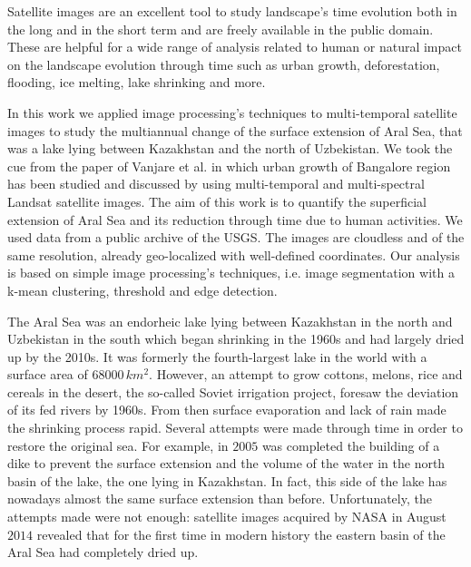 Satellite images are an excellent tool to study landscape's time evolution both in the long and in the short term and are freely available in the public domain. 
These are helpful for a wide range of analysis related to human or natural impact on the landscape evolution through time such as urban growth, deforestation, flooding, ice melting, lake shrinking and more.

In this work we applied image processing's techniques to multi-temporal satellite images to study the multiannual change of the surface extension of Aral Sea, that was a lake lying between Kazakhstan and the north of Uzbekistan. 
We took the cue from the paper of Vanjare et al. \cite{satelliteImg} in which urban growth of Bangalore region has been studied and discussed by using multi-temporal and multi-spectral Landsat satellite images. 
The aim of this work is to quantify the superficial extension of Aral Sea and its reduction through time due to human activities.
We used data from a public archive of the USGS. 
The images are cloudless and of the same resolution, already geo-localized with well-defined coordinates. 
Our analysis is based on simple image processing's techniques, i.e. image segmentation with a k-mean clustering, threshold and edge detection.

The Aral Sea was an endorheic lake lying between Kazakhstan in the north and Uzbekistan in the south which began shrinking in the 1960s and had largely dried up by the 2010s. 
It was formerly the fourth-largest lake in the world with a surface area of $68000\,km^2$.  
However, an attempt to grow cottons, melons, rice and cereals in the desert, the so-called Soviet irrigation project, foresaw the deviation of its fed rivers by 1960s. 
From then surface evaporation and lack of rain made the shrinking process rapid. Several attempts were made through time in order to restore the original sea.
For example, in $2005$ was completed the building of a dike to prevent the surface extension and the volume of the water in the north basin of the lake, the one lying in Kazakhstan. 
In fact, this side of the lake has nowadays almost the same surface extension than before. 
Unfortunately, the attempts made were not enough: satellite images acquired by NASA in August $2014$ revealed that for the first time in modern history the eastern basin of the Aral Sea had completely dried up.
